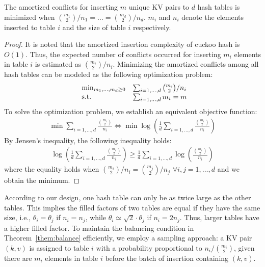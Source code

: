 \begin{theorem}\label{them:balance}
	The amortized conflicts for inserting $m$ unique KV pairs to $d$ hash tables is minimized when $\binom{m_1}{2}/n_1 = \ldots = \binom{m_d}{2}/n_d$. 
	$m_i$ and $n_i$ denote the elements inserted to table $i$ and the size of table $i$ respectively.  
\end{theorem}
\begin{proof}
	It is noted that the amortized insertion complexity of cuckoo hash is $O(1)$. Thus, the expected number of conflicts occurred for inserting $m_i$ elements in table $i$ is estimated as $\binom{m_i}{2}/n_i$. Minimizing the amortized conflicts among all hash tables can be modeled as the following optimization problem:
	\begin{equation}\label{eq:conflict-min}
	\begin{array}{ll@{}ll}
	\min_{m_1,\ldots,m_d \geq 0} & \sum_{i=1,\ldots,d} \binom{m_i}{2}/n_i \\
	\text{s.t.} & \sum_{i=1,\ldots,d} m_i = m
	\end{array}
	\end{equation}
	To solve the optimization problem, we establish an equivalent objective function:
	\begin{align*}
	\min \sum_{i=1,\ldots,d} \frac{\binom{m_i}{2}}{n_i} \Leftrightarrow \min \log(\frac{1}{d}\sum_{i=1,\ldots,d} \frac{\binom{m_i}{2}}{n_i})
	\end{align*}
	By Jensen's inequality, the following inequality holds:
	\begin{align*}
	\log(\frac{1}{d}\sum_{i=1,\ldots,d} \frac{\binom{m_i}{2}}{n_i}) \geq \frac{1}{d}\sum_{i=1,\ldots,d}\log(\frac{\binom{m_i}{2}}{n_i})
	\end{align*}
	where the equality holds when $\binom{m_i}{2}/n_i = \binom{m_j}{2}/n_j$ $\forall i,j = 1,\ldots,d$ and we obtain the minimum.
\end{proof}

According to our design, one hash table can only be as twice large as the other tables. 
This implies the filled factors of two tables are equal if they have the same size, i.e., $\theta_i = \theta_j$ if $n_i = n_j$, 
while $\theta_i \simeq \sqrt{2}\cdot \theta_j$ if $n_i = 2n_j$. 
Thus, larger tables have a higher filled factor. 
To maintain the balancing condition in Theorem~\ref{them:balance} efficiently, we employ a sampling approach: 
a KV pair $(k,v)$ is assigned to table $i$ with a probability proportional to $n_i/\binom{m_i}{2}$,
given there are $m_i$ elements in table $i$ before the batch of insertion containing $(k,v)$. 

